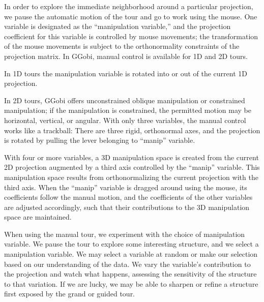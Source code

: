 \bigskip
{}  In order to explore
the immediate neighborhood around a particular projection, we pause
the automatic motion of the tour and go to work using the mouse.  One
variable is designated as the ``manipulation variable,'' and the
projection coefficient for this variable is controlled by mouse
movements; the transformation of the mouse movements is subject to the
orthonormality constraints of the projection matrix. In GGobi, manual
control is available for 1D and 2D tours.

In 1D tours the manipulation variable is rotated into or out of the
current 1D projection.

In 2D tours, GGobi offers unconstrained oblique manipulation or
constrained manipulation; if the manipulation is constrained, the
permitted motion may be horizontal, vertical, or angular.  With only
three variables, the manual control works like a trackball: There are
three rigid, orthonormal axes, and the projection is rotated by
pulling the lever belonging to ``manip'' variable.  

With four or more variables, a 3D manipulation space is created from
the current 2D projection augmented by a third axis controlled by the
``manip'' variable. This manipulation space results from
orthonormalizing the current projection with the third axis.  When the
``manip'' variable is dragged around using the mouse, its coefficients
follow the manual motion, and the coefficients of the other variables
are adjusted accordingly, such that their contributions to the 3D
manipulation space are maintained.

When using the manual tour, we experiment with the choice of
manipulation variable.  We pause the tour to explore some interesting
structure, and we select a manipulation variable.  We may select a
variable at random or make our selection based on our understanding
of the data.  We vary the variable's contribution to the projection
and watch what happens, assessing the sensitivity of the structure to
that variation.  If we are lucky, we may be able to sharpen or
refine a structure first exposed by the grand or guided tour.


